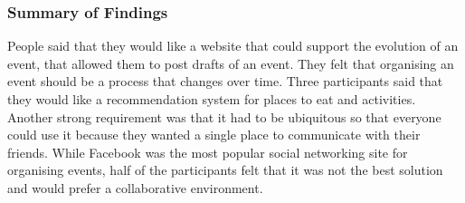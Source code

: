 \documentclass{sigchi}
\begin{document}

\subsubsection{Summary of Findings}
People said that they would like a website that could support the evolution of an event, that allowed them to post drafts of an event.  They felt that organising an event should be a process that changes over time.  Three participants said that they would like a recommendation system for places to eat and activities.  Another strong requirement was that it had to be ubiquitous so that everyone could use it because they wanted a single place to communicate with their friends.  While Facebook was the most popular social networking site for organising events, half of the participants felt that it was not the best solution and would prefer a collaborative environment.
\end{document}
